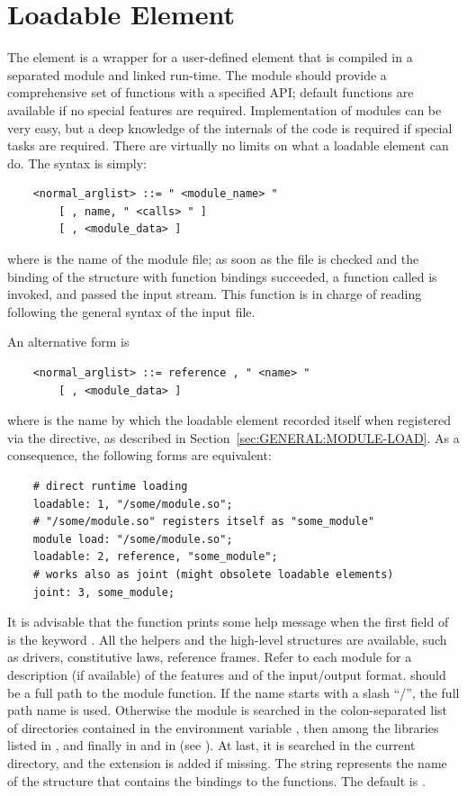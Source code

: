 \section{Loadable Element}\label{sec:EL:BASE:LOADABLE}
The  element is a wrapper for a user-defined element that is
compiled in a separated module and linked run-time.
The module should provide a comprehensive set of functions with a specified
API; default functions are available if no special features are required.
Implementation of modules can be very easy, but a deep knowledge of the
internals of the code is required if special tasks are required. 
There are virtually no limits on what a loadable element can do.
The syntax is simply:
\begin{verbatim}
    <normal_arglist> ::= " <module_name> "
        [ , name, " <calls> " ] 
        [ , <module_data> ]
\end{verbatim}
where  is the name of the module file; as soon as the file
is checked and the binding of the structure with function bindings 
succeeded, a function called  is invoked, and passed the input
stream.
This function is in charge of reading  following the
general syntax of the input file.

An alternative form is
\begin{verbatim}
    <normal_arglist> ::= reference , " <name> "
        [ , <module_data> ]
\end{verbatim}
where  is the name by which the loadable element recorded itself
when registered via the  directive, as described
in Section~\ref{sec:GENERAL:MODULE-LOAD}.
As a consequence, the following forms are equivalent:
\begin{verbatim}
    # direct runtime loading
    loadable: 1, "/some/module.so";
    # "/some/module.so" registers itself as "some_module"
    module load: "/some/module.so";
    loadable: 2, reference, "some_module";
    # works also as joint (might obsolete loadable elements)
    joint: 3, some_module;
\end{verbatim}

It is advisable that the function  prints some help message
when the first field of  is the keyword .
All the helpers and the high-level structures are available, such as
drivers, constitutive laws, reference frames.
Refer to each module for a description (if available) of the features and of
the input/output format.
 should be a full path to the module function.
If the name starts with a slash ``/'', the full path name is used.
Otherwise the module is searched in the colon-separated list of directories 
contained in the environment variable , then among the
libraries listed in , and finally in
 and in  (see ).
At last, it is searched in the current directory, and the extension
 is added if missing.
The string  represents the name of the structure that contains
the bindings to the functions.
The default is .

